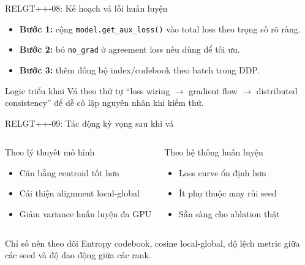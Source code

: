 \documentclass[aspectratio=169,11pt]{beamer}
\begin{document}
\begin{frame}{RELGT++-08: Kế hoạch vá lỗi huấn luyện}
  \begin{itemize}
    \item \textbf{Bước 1:} cộng \texttt{model.get\_aux\_loss()} vào total loss theo trọng số rõ ràng.
    \item \textbf{Bước 2:} bỏ \texttt{no\_grad} ở agreement loss nếu dùng để tối ưu.
    \item \textbf{Bước 3:} thêm đồng bộ index/codebook theo batch trong DDP.
  \end{itemize}
  \begin{block}{Logic triển khai}
    Vá theo thứ tự “loss wiring $\rightarrow$ gradient flow $\rightarrow$ distributed consistency” để dễ cô lập nguyên nhân khi kiểm thử.
  \end{block}
\end{frame}

\begin{frame}{RELGT++-09: Tác động kỳ vọng sau khi vá}
  \begin{columns}[T]
    \begin{block}{Theo lý thuyết mô hình}
      \begin{itemize}
        \item Cân bằng centroid tốt hơn
        \item Cải thiện alignment local-global
        \item Giảm variance huấn luyện đa GPU
      \end{itemize}
    \end{block}
    \begin{exampleblock}{Theo hệ thống huấn luyện}
      \begin{itemize}
        \item Loss curve ổn định hơn
        \item Ít phụ thuộc may rủi seed
        \item Sẵn sàng cho ablation thật
      \end{itemize}
    \end{exampleblock}
  \end{columns}
\begin{alertblock}{Chỉ số nên theo dõi}
  Entropy codebook, cosine local-global, độ lệch metric giữa các seed và độ dao động giữa các rank.
\end{alertblock}
\end{frame}
\end{document}
